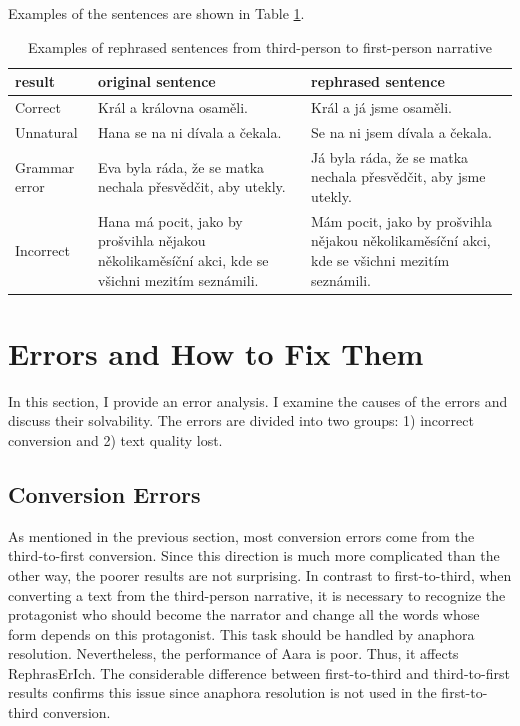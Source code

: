 Examples of the sentences are shown in Table \ref{tab:example-third}.

\begin{table}[!ht]
	\caption{Examples of rephrased sentences from third-person to first-person narrative}
	\label{tab:example-third}
	\begin{flushleft}
		\begin{tabular}{m{5em}|m{11em}|m{11em}}
			result & original sentence & rephrased sentence \\
			\hline
			Correct & Král a královna osaměli. & Král a já jsme osaměli. \\
			Unnatural & Hana se na ni dívala a čekala. & Se na ni jsem dívala a čekala. \\
			Grammar error & Eva byla ráda, že se matka nechala přesvědčit, aby utekly. & Já byla ráda, že se matka nechala přesvědčit, aby jsme utekly. \\
			Incorrect & Hana má pocit, jako by prošvihla nějakou několikaměsíční akci, kde se všichni mezitím seznámili. & Mám pocit, jako by prošvihla nějakou několikaměsíční akci, kde se všichni mezitím seznámili.\\
		\end{tabular}
	\end{flushleft}
\end{table}


\section{Errors and How to Fix Them} \label{sec:errors}

In this section, I provide an error analysis. I examine the causes of the errors and discuss their solvability. The errors are divided into two groups: 1) incorrect conversion and 2) text quality lost.

\subsection{Conversion Errors}

As mentioned in the previous section, most conversion errors come from the third-to-first conversion. Since this direction is much more complicated than the other way, the poorer results are not surprising. In contrast to first-to-third, when converting a text from the third-person narrative, it is necessary to recognize the protagonist who should become the narrator and change all the words whose form depends on this protagonist. This task should be handled by anaphora resolution. Nevertheless, the performance of Aara is poor. Thus, it affects RephrasErIch. The considerable difference between first-to-third and third-to-first results confirms this issue since anaphora resolution is not used in the first-to-third conversion.

